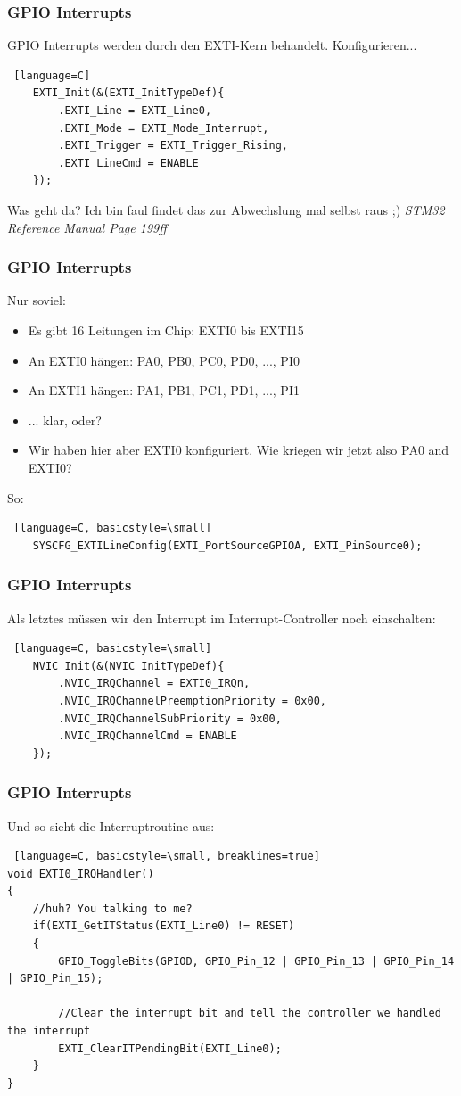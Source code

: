 \documentclass[ngerman,compress]{beamer}
\begin{document}
\begin{frame} [fragile]
	\frametitle{GPIO Interrupts}
	GPIO Interrupts werden durch den EXTI-Kern behandelt. Konfigurieren...
	\begin{lstlisting} [language=C]
	EXTI_Init(&(EXTI_InitTypeDef){
		.EXTI_Line = EXTI_Line0,
		.EXTI_Mode = EXTI_Mode_Interrupt,
		.EXTI_Trigger = EXTI_Trigger_Rising,
		.EXTI_LineCmd = ENABLE
	});
	\end{lstlisting}
	Was geht da? Ich bin faul findet das zur Abwechslung mal selbst raus ;) \emph{STM32 Reference Manual Page 199ff}
\end{frame}

\begin{frame} [fragile]
	\frametitle{GPIO Interrupts}
	Nur soviel:
	\begin{itemize}
		\item Es gibt 16 Leitungen im Chip: EXTI0 bis EXTI15
		\item An EXTI0 hängen: PA0, PB0, PC0, PD0, ..., PI0
		\item An EXTI1 hängen: PA1, PB1, PC1, PD1, ..., PI1
		\item ... klar, oder?
		\item Wir haben hier aber EXTI0 konfiguriert. Wie kriegen wir jetzt also PA0 and EXTI0?
	\end{itemize}
	\pause
	So:
	\begin{lstlisting} [language=C, basicstyle=\small]
	SYSCFG_EXTILineConfig(EXTI_PortSourceGPIOA, EXTI_PinSource0);
	\end{lstlisting}
\end{frame}

\begin{frame} [fragile]
	\frametitle{GPIO Interrupts}
	Als letztes müssen wir den Interrupt im Interrupt-Controller noch einschalten:
	\begin{lstlisting} [language=C, basicstyle=\small]
    NVIC_Init(&(NVIC_InitTypeDef){
        .NVIC_IRQChannel = EXTI0_IRQn,
        .NVIC_IRQChannelPreemptionPriority = 0x00,
        .NVIC_IRQChannelSubPriority = 0x00,
        .NVIC_IRQChannelCmd = ENABLE
    });
	\end{lstlisting}
\end{frame}

\begin{frame} [fragile]
	\frametitle{GPIO Interrupts}
	Und so sieht die Interruptroutine aus:
	\begin{lstlisting} [language=C, basicstyle=\small, breaklines=true]
void EXTI0_IRQHandler()
{
    //huh? You talking to me?
    if(EXTI_GetITStatus(EXTI_Line0) != RESET)
    {
        GPIO_ToggleBits(GPIOD, GPIO_Pin_12 | GPIO_Pin_13 | GPIO_Pin_14 | GPIO_Pin_15);

        //Clear the interrupt bit and tell the controller we handled the interrupt
        EXTI_ClearITPendingBit(EXTI_Line0);
    }
}
	\end{lstlisting}
\end{frame}
\end{document}
